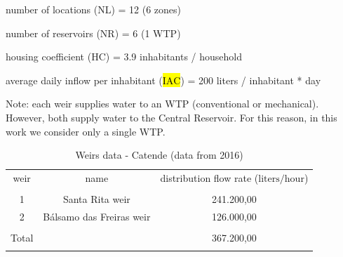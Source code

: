 \documentclass{singlecol}
\theoremstyle{TH}{
\newtheorem{lemma}{Lemma}
\newtheorem{theorem}[lemma]{Theorem}
\newtheorem{corrolary}[lemma]{Corrolary}
\newtheorem{conjecture}[lemma]{Conjecture}
\newtheorem{proposition}[lemma]{Proposition}
\newtheorem{claim}[lemma]{Claim}
\newtheorem{stheorem}[lemma]{Wrong Theorem}
\newtheorem{algorithm}{Algorithm}
}
\theoremstyle{THrm}{
\newtheorem{definition}{Definition}[section]
\newtheorem{question}{Question}[section]
\newtheorem{remark}{Remark}
\newtheorem{scheme}{Scheme}
}
\theoremstyle{THhit}{
\newtheorem{case}{Case}[section]
}
\begin{document}
\noindent number of locations (NL) = 12 (6 zones) 

\noindent number of reservoirs (NR) = 6 (1 WTP) 

\noindent housing coefficient ($\mathrm{HC}$) = 3.9 inhabitants / household 

\noindent average daily inflow per inhabitant (\hl{$\mathrm{IAC}$}) = 200 liters / inhabitant * day 

\noindent Note: each weir supplies water to an WTP (conventional or mechanical). However, both supply water to the Central Reservoir. For this reason, in this work we consider only a single WTP. 

\begin{table}[H]
\begin{center}
	\begin{tabular}{ c  c  c } 
		weir      & name        & distribution flow rate  ($\mathrm{liters/hour}$)     \\
		                                                                    \\
		1              & Santa Rita weir            & 241.200,00          \\
		2              & Bálsamo das Freiras  weir  & 126.000,00         \\
							                                                \\
		\hline
		Total          &                               & 367.200,00         \\
		\\
	\end{tabular}
\caption{Weirs data - Catende (data from 2016)}
\label{tab:weirsCatende}
\end{center}
\end{table}
\end{document}
